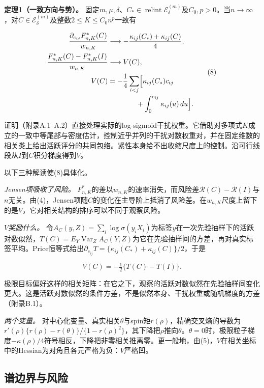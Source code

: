\documentclass[11pt,a4paper]{article}
\begin{document}
\textbf{定理1（一致方向与势）。}
固定\(m,\mu,\delta\)、\(C_*\in\operatorname{relint}\mathcal E_\delta^{(m)}\)及\(C_0,p>0\)。当\(n\to\infty\)，对\(C\in\mathcal E_\delta^{(m)}\)及整数\(2\le K\le C_0n^p\)一致有

\[
\begin{aligned}
\frac{\partial_{c_{ij}}F_{n,K}^*(C)}{w_{n,K}}
&\longrightarrow-\frac{\kappa_{ij}(C_*)+\kappa_{ij}(C)}4,\\
\frac{F_{n,K}^*(C)-F_{n,K}^*(I)}{w_{n,K}}
&\longrightarrow V(C),\\
V(C)&=-\frac14\sum_{i<j}\Bigl[\kappa_{ij}(C_*)c_{ij}\\
&\qquad\qquad+\int_0^{c_{ij}}\kappa_{ij}(u)\,du\Bigr].
\end{aligned}
\tag{8}
\]

证明（附录A.1--A.2）直接处理实际的log-sigmoid干扰权重。它借助对多项式\(K\)成立的一致中等尾部与密度估计，控制近乎并列的干扰对数权重对，并在固定维数的相关类上给出活跃评分的共同包络。紧性本身给不出收缩尺度上的控制。沿可行线段从\(I\)到\(C\)积分梯度得到\(V\)。

以下三种解读使(8)具体化。

\emph{Jensen项吸收了风险。}
\(F^*_{n,K}\)的差以\(w_{n,K}\)的速率消失，而风险差\(\mathcal R(C)-\mathcal R(I)\)与\(n\)无关。由(4)，Jensen项随\(C\)的变化在主导阶上抵消了风险差。在\(w_{n,K}\)尺度上留下的是\(V\)，它对相关结构的排序可以不同于观察风险。

\emph{\(V\)奖励什么。}
令\(A_C(y,Z)=\sum_i\log\sigma(y_iX_i)\)为标签\(y\)在一次先验抽样下的活跃对数似然，\(T(C)=E_Y\operatorname{Var}_ZA_C(Y,Z)\)为它在先验抽样间的方差，再对真实标签平均。Price恒等式给出\(\partial_{c_{ij}}T=\{\kappa_{ij}(C_*)+\kappa_{ij}(C)\}/2\)，于是

\[
V(C)=-\tfrac12\{T(C)-T(I)\}.
\]

极限目标偏好这样的相关矩阵：在它之下，观察的活跃对数似然在先验抽样间变化更大。这是活跃对数似然的条件方差，不是似然本身、干扰权重或随机梯度的方差（附录B.1）。

\emph{两个变量。}
对中心化变量、真实相关\(\theta\)与spin矩\(r(\rho)\)，精确交叉熵的导数为\(r'(\rho)\{r(\rho)-r(\theta)\}/\{1-r(\rho)^2\}\)，其下降把\(\rho\)推向\(\theta\)。\(\theta=0\)时，极限粒子梯度\(-\kappa(\rho)/4\)符号相反，下降把非零相关推离零。更一般地，由(5)，\(V\)在相关坐标中的Hessian为对角且各元严格为负：\(V\)严格凹。

\subsection{谱边界与风险}\label{ux8c31ux8fb9ux754cux4e0eux98ceux9669}
\end{document}
